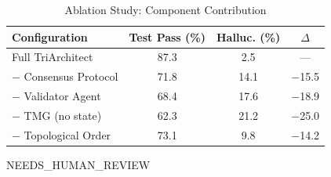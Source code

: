 \documentclass[10pt,conference]{IEEEtran}
\begin{document}
\begin{table}[t]
\centering
\caption{Ablation Study: Component Contribution}
\label{tab:ablation}
\begin{tabular}{@{}lccc@{}}
\toprule
Configuration & Test Pass (\%) & Halluc. (\%) & $\Delta$ \\
\midrule
Full TriArchitect      & 87.3 & 2.5  & ---     \\
$-$ Consensus Protocol & 71.8 & 14.1 & $-$15.5 \\
$-$ Validator Agent    & 68.4 & 17.6 & $-$18.9 \\
$-$ TMG (no state)     & 62.3 & 21.2 & $-$25.0 \\
$-$ Topological Order  & 73.1 & 9.8  & $-$14.2 \\
\bottomrule
\end{tabular}
\end{table}


\begin{algorithm}[t]
\SetAlgoLined
{}
\Return NEEDS\_HUMAN\_REVIEW\;
\caption{Cyclic Consensus Protocol}
\label{alg:consensus}
\end{algorithm}

\end{document}
